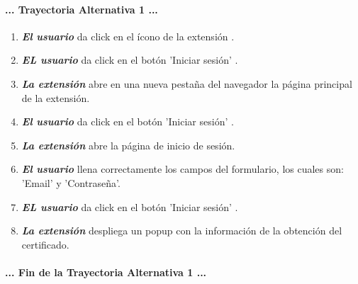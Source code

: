 \documentclass[12pt, a4paper, titlepage]{report}
\newcommand*{\img}[1]{%
    \raisebox{-.3\baselineskip}{%
        \texttt{[image: \#1]}%
    }%
}
\begin{document}
				\paragraph{... Trayectoria Alternativa 1 ...}
				\begin{enumerate}
				
					\item \textbf{\textit{El usuario}} da click en el ícono de la extensión \img{imagenes/Disenio/Componente_1/UI_icon_escom.png}.
					
					\item \textbf{\textit{EL usuario}} da click en el botón 'Iniciar sesión' \img{imagenes/Disenio/Componente_1/UI_btn_login.png}.
					
					\item \textbf{\textit{La extensión}} abre en una nueva pestaña del navegador la página principal de la extensión.
					
					\item \textbf{\textit{El usuario}} da click en el botón 'Iniciar sesión' \img{imagenes/Disenio/Componente_1/UI_btn_loginMainPage.png}.
					
					\item \textbf{\textit{La extensión}} abre la página de inicio de sesión.
					
					\item \textbf{\textit{El usuario}} llena correctamente los campos del formulario, los cuales son: 'Email' y 'Contraseña'.
					
					\item \textbf{\textit{EL usuario}} da click en el botón 'Iniciar sesión' \img{imagenes/Disenio/Componente_1/UI_btn_login.png}.
					
					\item \textbf{\textit{La extensión}} despliega un popup con la información de la obtención del certificado.
					
				\end{enumerate}
				\paragraph{... Fin de la Trayectoria Alternativa 1 ...}
			    
			    
\end{document}
